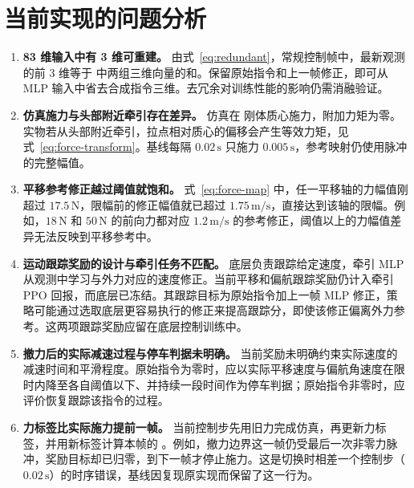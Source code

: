 \section{当前实现的问题分析}

\begin{enumerate}[itemsep=0.55em]
  \item \textbf{83 维输入中有 3 维可重建。}
  由式~\eqref{eq:redundant}，常规控制帧中，最新观测的前 3 维等于  中两组三维向量的和。保留原始指令和上一帧修正，即可从 MLP 输入中省去合成指令三维。去冗余对训练性能的影响仍需消融验证。

  \item \textbf{仿真施力与头部附近牵引存在差异。}
  仿真在  刚体质心施力，附加力矩为零。实物若从头部附近牵引，拉点相对质心的偏移会产生等效力矩，见式~\eqref{eq:force-transform}。基线每隔 $0.02\,\mathrm{s}$ 只施力 $0.005\,\mathrm{s}$，参考映射仍使用脉冲的完整幅值。

  \item \textbf{平移参考修正越过阈值就饱和。}
  式~\eqref{eq:force-map} 中，任一平移轴的力幅值刚超过 $17.5\,\mathrm{N}$，限幅前的修正幅值就已超过 $1.75\,\mathrm{m/s}$，直接达到该轴的限幅。例如，$18\,\mathrm{N}$ 和 $50\,\mathrm{N}$ 的前向力都对应 $1.2\,\mathrm{m/s}$ 的参考修正，阈值以上的力幅值差异无法反映到平移参考中。

  \item \textbf{运动跟踪奖励的设计与牵引任务不匹配。}
  底层负责跟踪给定速度，牵引 MLP 从观测中学习与外力对应的速度修正。当前平移和偏航跟踪奖励仍计入牵引 PPO 回报，而底层已冻结。其跟踪目标为原始指令加上一帧 MLP 修正，策略可能通过选取底层更容易执行的修正来提高跟踪分，即使该修正偏离外力参考。这两项跟踪奖励应留在底层控制训练中。

  \item \textbf{撤力后的实际减速过程与停车判据未明确。}
  当前奖励未明确约束实际速度的减速时间和平滑程度。原始指令为零时，应以实际平移速度与偏航角速度在限时内降至各自阈值以下、并持续一段时间作为停车判据；原始指令非零时，应评价恢复跟踪该指令的过程。

  \item \textbf{力标签比实际施力提前一帧。}
  当前控制步先用旧力完成仿真，再更新力标签，并用新标签计算本帧的 。例如，撤力边界这一帧仍受最后一次非零力脉冲，奖励目标却已归零，到下一帧才停止施力。这是切换时相差一个控制步（$0.02\,\mathrm{s}$）的时序错误，基线因复现原实现而保留了这一行为。
\end{enumerate}
